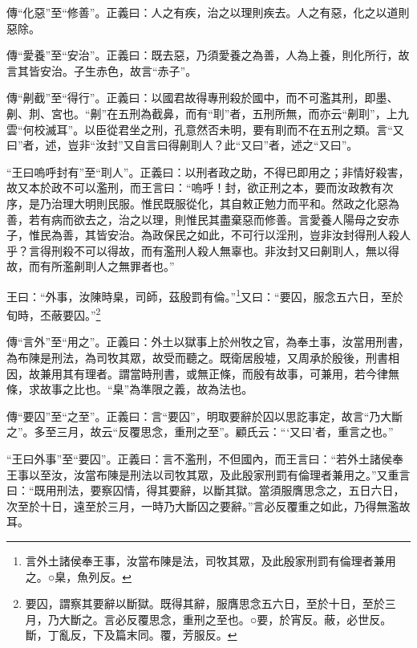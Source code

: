 {\noindent\zhuan{}\fzbyks 傳“化惡”至“修善”。正義曰：人之有疾，治之以理則疾去。人之有惡，化之以道則惡除。 \par}

{\noindent\zhuan{}\fzbyks 傳“愛養”至“安治”。正義曰：既去惡，乃須愛養之為善，人為上養，則化所行，故言其皆安治。子生赤色，故言“赤子”。 \par}

{\noindent\zhuan{}\fzbyks 傳“劓截”至“得行”。正義曰：以國君故得專刑殺於國中，而不可濫其刑，即墨、劓、剕、宮也。“劓”在五刑為截鼻，而有“刵”者，五刑所無，而亦云“劓刵”，上九雲“何校滅耳”。以臣從君坐之刑，孔意然否未明，要有刵而不在五刑之類。言“又曰”者，述，豈非“汝封”又自言曰得劓刵人？此“又曰”者，述之“又曰”。 \par}

{\noindent\shu{}\fzkt “王曰嗚呼封有”至“刵人”。正義曰：以刑者政之助，不得已即用之；非情好殺害，故又本於政不可以濫刑，而王言曰：“嗚呼！封，欲正刑之本，要而汝政教有次序，是乃治理大明則民服。惟民既服從化，其自敕正勉力而平和。然政之化惡為善，若有病而欲去之，治之以理，則惟民其盡棄惡而修善。言愛養人陽母之安赤子，惟民為善，其皆安治。為政保民之如此，不可行以淫刑，豈非汝封得刑人殺人乎？言得刑殺不可以得故，而有濫刑人殺人無辜也。非汝封又曰劓刵人，無以得故，而有所濫劓刵人之無罪者也。” \par}

王曰：“外事，汝陳時臬，司師，茲殷罰有倫。”\footnote{言外土諸侯奉王事，汝當布陳是法，司牧其眾，及此殷家刑罰有倫理者兼用之。○臬，魚列反。}又曰：“要囚，服念五六日，至於旬時，丕蔽要囚。”\footnote{要囚，謂察其要辭以斷獄。既得其辭，服膺思念五六日，至於十日，至於三月，乃大斷之。言必反覆思念，重刑之至也。○要，於宵反。蔽，必世反。斷，丁亂反，下及篇末同。覆，芳服反。}


{\noindent\zhuan{}\fzbyks 傳“言外”至“用之”。正義曰：外土以獄事上於州牧之官，為奉土事，汝當用刑書，為布陳是刑法，為司牧其眾，故受而聽之。既衛居殷墟，又周承於殷後，刑書相因，故兼用其有理者。謂當時刑書，或無正條，而殷有故事，可兼用，若今律無條，求故事之比也。“臬”為準限之義，故為法也。 \par}

{\noindent\zhuan{}\fzbyks 傳“要囚”至“之至”。正義曰：言“要囚”，明取要辭於囚以思訖事定，故言“乃大斷之”。多至三月，故云“反覆思念，重刑之至”。顧氏云：“‘又曰’者，重言之也。” \par}

{\noindent\shu{}\fzkt “王曰外事”至“要囚”。正義曰：言不濫刑，不但國內，而王言曰：“若外土諸侯奉王事以至汝，汝當布陳是刑法以司牧其眾，及此殷家刑罰有倫理者兼用之。”又重言曰：“既用刑法，要察囚情，得其要辭，以斷其獄。當須服膺思念之，五日六日，次至於十日，遠至於三月，一時乃大斷囚之要辭。”言必反覆重之如此，乃得無濫故耳。 \par}


